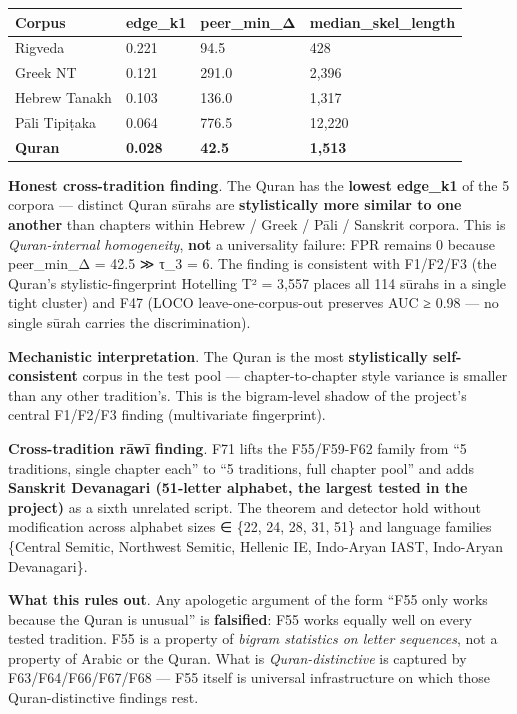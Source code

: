 \documentclass[
]{article}
\newcounter{none} %
\begin{document}
{\def\LTcaptype{none} %
\begin{longtable}[]{@{}llll@{}}
\toprule\noalign{}
Corpus & edge\_k1 & peer\_min\_Δ & median\_skel\_length \\
\midrule\noalign{}
\endhead
\bottomrule\noalign{}
\endlastfoot
Rigveda & 0.221 & 94.5 & 428 \\
Greek NT & 0.121 & 291.0 & 2,396 \\
Hebrew Tanakh & 0.103 & 136.0 & 1,317 \\
Pāli Tipiṭaka & 0.064 & 776.5 & 12,220 \\
\textbf{Quran} & \textbf{0.028} & \textbf{42.5} & \textbf{1,513} \\
\end{longtable}
}

\textbf{Honest cross-tradition finding}. The Quran has the
\textbf{lowest edge\_k1} of the 5 corpora --- distinct Quran sūrahs are
\textbf{stylistically more similar to one another} than chapters within
Hebrew / Greek / Pāli / Sanskrit corpora. This is \emph{Quran-internal
homogeneity}, \textbf{not} a universality failure: FPR remains 0 because
peer\_min\_Δ = 42.5 ≫ τ\_3 = 6. The finding is consistent with F1/F2/F3
(the Quran's stylistic-fingerprint Hotelling T² = 3,557 places all 114
sūrahs in a single tight cluster) and F47 (LOCO leave-one-corpus-out
preserves AUC ≥ 0.98 --- no single sūrah carries the discrimination).

\textbf{Mechanistic interpretation}. The Quran is the most
\textbf{stylistically self-consistent} corpus in the test pool ---
chapter-to-chapter style variance is smaller than any other tradition's.
This is the bigram-level shadow of the project's central F1/F2/F3
finding (multivariate fingerprint).

\textbf{Cross-tradition rāwī finding}. F71 lifts the F55/F59-F62 family
from ``5 traditions, single chapter each'' to ``5 traditions, full
chapter pool'' and adds \textbf{Sanskrit Devanagari (51-letter alphabet,
the largest tested in the project)} as a sixth unrelated script. The
theorem and detector hold without modification across alphabet sizes ∈
\{22, 24, 28, 31, 51\} and language families \{Central Semitic,
Northwest Semitic, Hellenic IE, Indo-Aryan IAST, Indo-Aryan
Devanagari\}.

\textbf{What this rules out}. Any apologetic argument of the form ``F55
only works because the Quran is unusual'' is \textbf{falsified}: F55
works equally well on every tested tradition. F55 is a property of
\emph{bigram statistics on letter sequences}, not a property of Arabic
or the Quran. What is \emph{Quran-distinctive} is captured by
F63/F64/F66/F67/F68 --- F55 itself is universal infrastructure on which
those Quran-distinctive findings rest.
\end{document}
